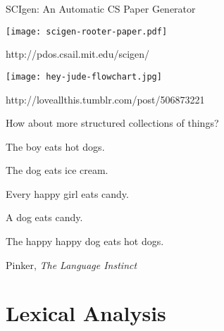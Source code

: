 \documentclass{plt}
\begin{document}
\begin{frame}{SCIgen: An Automatic CS Paper Generator}

\texttt{[image: scigen-rooter-paper.pdf]}

\tiny
http://pdos.csail.mit.edu/scigen/
\end{frame}

\begin{frame}
\centerline{\texttt{[image: hey-jude-flowchart.jpg]}}

\footnotesize http://loveallthis.tumblr.com/post/506873221
\end{frame}

\begin{frame}[fragile]{How about more structured collections of things?}

The boy eats hot dogs.

The dog eats ice cream.

Every happy girl eats candy.

A dog eats candy.

The happy happy dog eats hot dogs.


\tiny Pinker, \emph{The Language Instinct}

\end{frame}

\part{Lexical Analysis}
\frame{\partpage}
\end{document}
